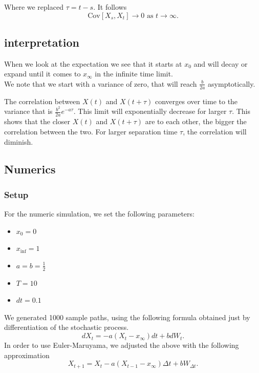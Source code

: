 \documentclass[a4paper,12pt]{article} %
\newcommand{\Cov}{\mathrm{Cov}}
\begin{document}
Where we replaced \(\tau = t-s\).
It follows
\begin{equation}
    \Cov\left[X_s, X_t \right] \to 0 \text{ as } t\to \infty.
\end{equation}


\subsection{interpretation}
When we look at the expectation we see that it starts at $x_0$ and will decay or expand until it comes to $x_\infty$ in the infinite time limit.\\

We note that we start with a variance of zero, that will reach $\frac{b}{2a}$ asymptotically.

The correlation between $X(t)$ and $X(t+\tau)$ converges over time to the variance that is $\frac{b^2}{2a} e^{-a\tau}$.  This limit will exponentially decrease for larger $\tau$. This shows that the closer $X(t)$ and $X(t+\tau)$ are to each other, the bigger the correlation between the two. For larger separation time $\tau$, the correlation will diminish.


\subsection{Numerics}
\subsubsection{Setup}
For the numeric simulation, we set the following parameters:
\begin{itemize}
    \item \(x_{0} =0\)
    \item \(x_{\inf }= 1 \)
    \item \(a=b=\frac{1}{2}\)
    \item \(T=10\)
    \item \(dt=0.1\)
\end{itemize}
We generated 1000 sample paths, using the following formula obtained just by differentiation of the stochastic process.
\begin{equation}
    dX_t = - a(X_{t}-x_\infty  )dt +b dW_t.
\end{equation}
In order to use Euler-Maruyama, we adjusted the above with the following approximation
\begin{equation}
    X_{t+1} = X_t - a(X_{t-1}-x_\infty ) \Delta  t+ b W_{\Delta t}.
\end{equation}
\end{document}
